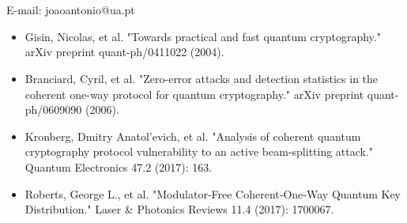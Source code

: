 \documentclass[40pt]{article}
\newcommand{\mysection}[1]{\section*{\color{black}\sffamily #1}}%
\begin{document}
\mysection{} \sffamily \Large
\vspace{-10mm}
\centerline{E-mail: joaoantonio@ua.pt}
\vspace*{7cm}
\begin{itemize}
	\item Gisin, Nicolas, et al. "Towards practical and fast quantum cryptography." arXiv preprint quant-ph/0411022 (2004).
	\item Branciard, Cyril, et al. "Zero-error attacks and detection statistics in the coherent one-way protocol for quantum cryptography." arXiv preprint quant-ph/0609090 (2006).
	\item Kronberg, Dmitry Anatol'evich, et al. "Analysis of coherent quantum cryptography protocol vulnerability to an active beam-splitting attack." Quantum Electronics 47.2 (2017): 163.
	\item Roberts, George L., et al. "Modulator‐Free Coherent‐One‐Way Quantum Key Distribution." Laser \& Photonics Reviews 11.4 (2017): 1700067.
\end{itemize}
\end{document}
